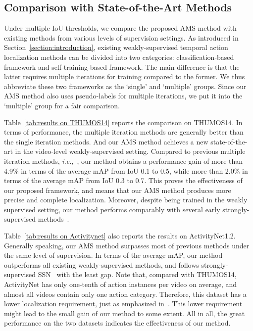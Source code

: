 \documentclass[journal]{IEEEtran}
\begin{document}
\subsection{Comparison with State-of-the-Art Methods}
Under multiple IoU thresholds, we compare the proposed AMS method with existing methods from various levels of supervision settings. As introduced in Section~\ref{section:introduction}, existing weakly-supervised temporal action localization methods can be divided into two categories: classification-based framework and self-training-based framework. The main difference is that the latter requires multiple iterations for training compared to the former. We thus abbreviate these two frameworks as the `single' and `multiple' groups. Since our AMS method also uses pseudo-labels for multiple iterations, we put it into the `multiple' group for a fair comparison.



Table~\ref{tab:results on THUMOS14} reports the comparison on THUMOS14. In terms of performance, the multiple iteration methods are generally better than the single iteration methods. And our AMS method achieves a new state-of-the-art in the video-level weakly-supervised setting. Compared to previous multiple iteration methods, \emph{i.e.},~\cite{luo2020weakly, pardo2021refineloc, zhai2020two}, our method obtains a performance gain of more than 4.9\% in terms of the average mAP from IoU 0.1 to 0.5, while more than 2.0\% in terms of the average mAP from IoU 0.3 to 0.7. This proves the effectiveness of our proposed framework, and means that our AMS method produces more precise and complete localization. Moreover, despite being trained in the weakly supervised setting, our method performs comparably with several early strongly-supervised methods~\cite{shou2016temporal,gao2017turn,zhao2017temporal}.



Table~\ref{tab:results on Activitynet} also reports the results on ActivityNet1.2. Generally speaking, our AMS method surpasses most of previous methods under the same level of supervision. In terms of the average mAP, our method outperforms all existing weakly-supervised methods, and follows strongly-supervised SSN~\cite{zhao2017temporal} with the least gap. Note that, compared with THUMOS14, ActivityNet has only one-tenth of action instances per video on average, and almost all videos contain only one action category. Therefore, this dataset has a lower localization requirement, just as emphasized in~\cite{chao2018rethinking,zhang2019adversarial,luo2020weakly}. This lower requirement might lead to the small gain of our method to some extent. All in all, the great performance on the two datasets indicates the effectiveness of our method.
\end{document}
